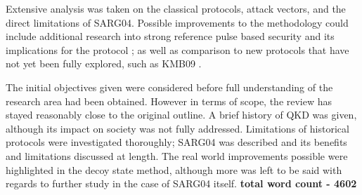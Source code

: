 \documentclass[paper=a4, fontsize=11pt]{scrartcl} %
\numberwithin{equation}{section} %
\numberwithin{figure}{section} %
\numberwithin{table}{section} %
\begin{document}
Extensive analysis was taken on the classical protocols, attack vectors, and the direct limitations of SARG04. Possible improvements
to the methodology could include additional research into strong reference pulse based security and its implications for the protocol \citep{koashi2004};
as well as comparison to new protocols that have not yet been fully explored, such as KMB09 \citep{KMB09}.

The initial objectives given were considered before full understanding of the research area had been obtained. However
in terms of scope, the review has stayed reasonably close to the original outline. A brief history of QKD was given, although
its impact on society was not fully addressed. Limitations of historical protocols were investigated thoroughly; SARG04 was described
and its benefits and limitations discussed at length. The real world improvements possible were highlighted in the decoy state
method, although more was left to be said with regards to further study in the case of SARG04 itself.
\vfill
\textbf{total word count - 4602}




\clearpage


\clearpage
\printnoidxglossaries
\end{document}
